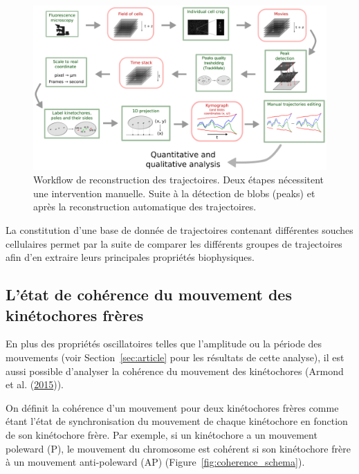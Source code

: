 \documentclass[12pt,a4paper,twoside,openright]{book}
\begin{document}
\begin{figure}[htbp]
\centering
\includegraphics{figures/results/imaging/workflow.png}
\caption[Workflow de reconstruction des trajectoires]{\label{fig:workflow}Workflow
de reconstruction des trajectoires. Deux étapes nécessitent une
intervention manuelle. Suite à la détection de blobs (peaks) et après la
reconstruction automatique des trajectoires.}
\end{figure}

La constitution d'une base de donnée de trajectoires contenant
différentes souches cellulaires permet par la suite de comparer les
différents groupes de trajectoires afin d'en extraire leurs principales
propriétés biophysiques.

\subsection{L'état de cohérence du mouvement des kinétochores
frères}\label{luxe9tat-de-cohuxe9rence-du-mouvement-des-kinuxe9tochores-fruxe8res}

\label{sec:coherence}

En plus des propriétés oscillatoires telles que l'amplitude ou la
période des mouvements (voir Section~\ref{sec:article} pour les
résultats de cette analyse), il est aussi possible d'analyser la
cohérence du mouvement des kinétochores (Armond et al.
(\protect\hyperlink{ref-Armond2015}{2015})).

On définit la cohérence d'un mouvement pour deux kinétochores frères
comme étant l'état de synchronisation du mouvement de chaque kinétochore
en fonction de son kinétochore frère. Par exemple, si un kinétochore a
un mouvement poleward (P), le mouvement du chromosome est cohérent si
son kinétochore frère à un mouvement anti-poleward (AP)
(Figure~\ref{fig:coherence_schema}).
\end{document}
